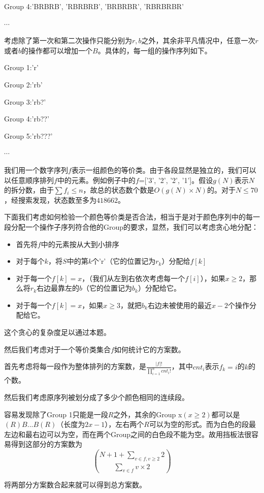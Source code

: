\documentclass[12pt]{article}
\begin{document}
Group 4:'BRBRB', 'RBRBRB', 'BRBRBR', 'RBRBRBR'

$\cdots$

考虑除了第一次和第二次操作只能分别为$r,b$之外，其余非平凡情况中，任意一次$r$或者$b$的操作都可以增加一个$B$。具体的，每一组的操作序列如下。

Group 1:'r'

Group 2:'rb'

Group 3:'rb?'

Group 4:'rb??'

Group 5:'rb???'

$\cdots$

我们用一个数字序列$f$表示一组颜色的等价类。由于各段显然是独立的，我们可以以任意顺序排列$f$中的元素。例如例子中的$f$=['3', '2', '2', '1']。假设$g(N)$表示$N$的拆分数，由于$\sum{f_i}\le n$，故总的状态数个数是$O(g(N)\times N)$的。对于$N\le 70$，经搜索发现，状态数至多为$418662$。

下面我们考虑如何检验一个颜色等价类是否合法，相当于是对于颜色序列中的每一段分配一个操作子序列符合他的Group的要求，显然，我们可以考虑贪心地分配：
\begin{itemize}
  \item 首先将$f$中的元素按从大到小排序
  \item 对于每个$k$，将$S$中的第$k$个'r'（它的位置记为$r_k$）分配给$f[k]$
  \item 对于每一个$f[k]=x$，（我们从左到右依次考虑每一个$f[i]$），如果$x\ge 2$，那么将$r_k$右边最靠左的$b$（它的位置记为$b_k$）分配给它。
  \item 对于每一个$f[k]=x$，如果$x\ge 3$，就把$b_k$右边未被使用的最近$x-2$个操作分配给它。
\end{itemize}

这个贪心的复杂度足以通过本题。

然后我们考虑对于一个等价类集合$f$如何统计它的方案数。

首先考虑将每一段作为整体排列的方案数，是$\frac{|f|!}{\prod_{i=1}^{n}cnt_i!}$，其中$cnt_i$表示$f_k=i$的$k$的个数。

然后我们考虑原序列被划分成了多少个颜色相同的连续段。

容易发现除了Group 1只能是一段$R$之外，其余的Group x$(x \ge 2)$都可以是$(R)B...B(R)$（长度为$2x-1$），左右两个$R$可以为空的形式。而为白色的段最左边和最右边可以为空，而在两个Group之间的白色段不能为空。故用挡板法很容易得到这部分的方案数为
$$
\binom{N + 1 + \sum_{v\in f, v\ge 2} 2}{\sum_{v\in f} v\times 2}
$$

将两部分方案数合起来就可以得到总方案数。
\end{document}
